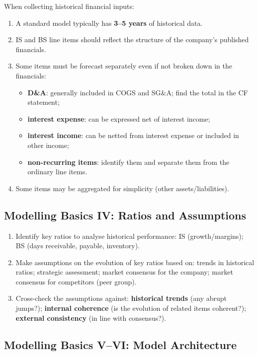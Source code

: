 When collecting historical financial inputs:
\begin{enumerate}
  \item A standard model typically has \textbf{3--5 years} of historical data.
  \item IS and BS line items should reflect the structure of the company's published financials.
  \item Some items must be forecast separately even if not broken down in the financials:
  \begin{itemize}
    \item \textbf{D\&A}: generally included in COGS and SG\&A; find the total in the CF statement;
    \item \textbf{interest expense}: can be expressed net of interest income;
    \item \textbf{interest income}: can be netted from interest expense or included in other income;
    \item \textbf{non-recurring items}: identify them and separate them from the ordinary line items.
  \end{itemize}
  \item Some items may be aggregated for simplicity (other assets/liabilities).
\end{enumerate}

\subsection[Modelling Basics IV: Ratios and Assumptions]{Modelling Basics IV: Ratios and Assumptions }

\begin{enumerate}
  \item Identify key ratios to analyse historical performance: IS (growth/margins); BS (days receivable, payable, inventory).
  \item Make assumptions on the evolution of key ratios based on: trends in historical ratios; strategic assessment; market consensus for the company; market consensus for competitors (peer group).
  \item Cross-check the assumptions against: \textbf{historical trends} (any abrupt jumps?); \textbf{internal coherence} (is the evolution of related items coherent?); \textbf{external consistency} (in line with consensus?).
\end{enumerate}

\subsection[Modelling Basics V--VI: Model Architecture]{Modelling Basics V--VI: Model Architecture }

